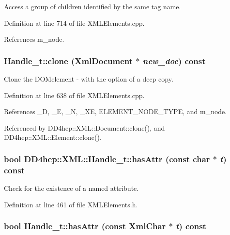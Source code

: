 Access a group of children identified by the same tag name. 

Definition at line 714 of file XMLElements.cpp.

References m\_\-node.\hypertarget{class_d_d4hep_1_1_x_m_l_1_1_handle__t_af92f09b4b063b0eed9cc28a630177278}{
\subsubsection[{clone}]{ Handle\_\-t::clone (XmlDocument $\ast$ {\em new\_\-doc}) const}}
\label{class_d_d4hep_1_1_x_m_l_1_1_handle__t_af92f09b4b063b0eed9cc28a630177278}


Clone the DOMelement -\/ with the option of a deep copy. 

Definition at line 638 of file XMLElements.cpp.

References \_\-D, \_\-E, \_\-N, \_\-XE, ELEMENT\_\-NODE\_\-TYPE, and m\_\-node.

Referenced by DD4hep::XML::Document::clone(), and DD4hep::XML::Element::clone().\hypertarget{class_d_d4hep_1_1_x_m_l_1_1_handle__t_a3092f69a380f662117c5b71f873d3590}{
\subsubsection[{hasAttr}]{\setlength{\rightskip}{0pt plus 5cm}bool DD4hep::XML::Handle\_\-t::hasAttr (const char $\ast$ {\em t}) const}}
\label{class_d_d4hep_1_1_x_m_l_1_1_handle__t_a3092f69a380f662117c5b71f873d3590}


Check for the existence of a named attribute. 

Definition at line 461 of file XMLElements.h.\hypertarget{class_d_d4hep_1_1_x_m_l_1_1_handle__t_a9ff6d04709536147ed8637d85c294dde}{
\subsubsection[{hasAttr}]{\setlength{\rightskip}{0pt plus 5cm}bool Handle\_\-t::hasAttr (const {\bf XmlChar} $\ast$ {\em t}) const}}
\label{class_d_d4hep_1_1_x_m_l_1_1_handle__t_a9ff6d04709536147ed8637d85c294dde}


